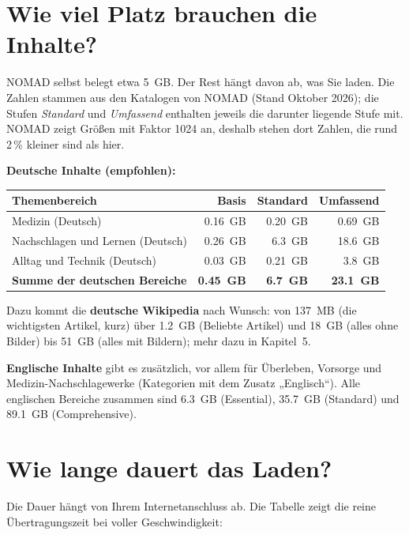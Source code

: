 
\section{Wie viel Platz brauchen die Inhalte?}
NOMAD selbst belegt etwa 5~GB. Der Rest hängt davon ab, was Sie laden. Die Zahlen stammen aus den Katalogen von NOMAD (Stand Oktober 2026); die Stufen \emph{Standard} und \emph{Umfassend} enthalten jeweils die darunter liegende Stufe mit. NOMAD zeigt Größen mit Faktor 1024 an, deshalb stehen dort Zahlen, die rund 2\,\% kleiner sind als hier.

\textbf{Deutsche Inhalte (empfohlen):}

\renewcommand{\arraystretch}{1.25}
\begin{center}
\small
\begin{tabular}{@{}lrrr@{}}
\toprule
\textbf{Themenbereich} & \textbf{Basis} & \textbf{Standard} & \textbf{Umfassend} \\
\midrule
Medizin (Deutsch) & \SI{0,16}{GB} & \SI{0,20}{GB} & \SI{0,69}{GB} \\
Nachschlagen und Lernen (Deutsch) & \SI{0,26}{GB} & \SI{6,3}{GB} & \SI{18,6}{GB} \\
Alltag und Technik (Deutsch) & \SI{0,03}{GB} & \SI{0,21}{GB} & \SI{3,8}{GB} \\
\midrule
\textbf{Summe der deutschen Bereiche} & \textbf{\SI{0,45}{GB}} & \textbf{\SI{6,7}{GB}} & \textbf{\SI{23,1}{GB}} \\
\bottomrule
\end{tabular}
\end{center}

Dazu kommt die \textbf{deutsche Wikipedia} nach Wunsch: von \SI{137}{MB} (die wichtigsten Artikel, kurz) über \SI{1,2}{GB} (Beliebte Artikel) und \SI{18}{GB} (alles ohne Bilder) bis \SI{51}{GB} (alles mit Bildern); mehr dazu in Kapitel~5.

\textbf{Englische Inhalte} gibt es zusätzlich, vor allem für Überleben, Vorsorge und Medizin-Nachschlagewerke (Kategorien mit dem Zusatz „Englisch“). Alle englischen Bereiche zusammen sind \SI{6,3}{GB} (Essential), \SI{35,7}{GB} (Standard) und \SI{89,1}{GB} (Comprehensive).

\section{Wie lange dauert das Laden?}
Die Dauer hängt von Ihrem Internetanschluss ab. Die Tabelle zeigt die reine Übertragungszeit bei voller Geschwindigkeit:

